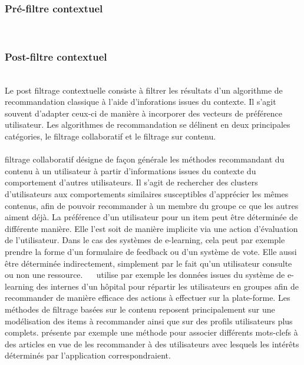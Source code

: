 \documentclass[conference]{./sty/IEEEtran}
\begin{document}
\subsubsection{Pré-filtre contextuel}
~\\

\subsubsection{Post-filtre contextuel}
~\\Le post filtrage contextuelle consiste à filtrer les résultats d'un algorithme de recommandation classique à l'aide d'inforations issues du contexte\cite{DBLP:journals/tlt/VerbertMOWDBD12}. Il s'agit souvent d'adapter ceux-ci de manière à incorporer des vecteurs de préférence utilisateur. Les algorithmes de recommandation se délinent en deux principales catégories, le filtrage collaboratif et le filtrage sur contenu.\\
~\\\Le filtrage collaboratif désigne de façon générale les méthodes recommandant du contenu à un utilisateur à partir d'informations issues du contexte du comportement d'autres utilisateurs. Il s'agit de rechercher des clusters d'utilisateurs aux comportements similaires susceptibles d'apprécier les mêmes contenus, afin de pouvoir recommander à un membre du groupe ce que les autres aiment déjà. La préférence d'un utilisateur pour un item peut être déterminée de différente manière. Elle l'est soit de manière implicite via une action d'évaluation de l'utilisateur. Dans le cas des systèmes de e-learning, cela peut par exemple prendre la forme d'un formulaire de feedback ou d'un système de vote. Elle aussi être déterminée indirectement, simplement par le fait qu'un utilisateur consulte ou non une ressource. ~\ \cite{Liou:2014:CPL:2617848.2617854} utilise par exemple les données issues du système de  e-learning des internes d'un hôpital pour répartir les utilisateurs en groupes afin de recommander de manière efficace des actions à effectuer sur la plate-forme. Les méthodes de filtrage basées sur le contenu reposent principalement sur une modélisation des items à recommander ainsi que sur des profils utilisateurs plus complets. \cite{DBLP:journals/jucs/SternKHKL10} présente par exemple une méthode pour associer différents mots-clefs à des articles en vue de les recommander à des utilisateurs avec lesquels les intérêts déterminés par l'application correspondraient.
\end{document}
